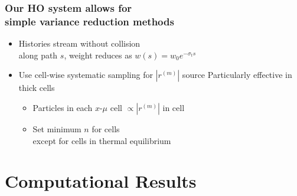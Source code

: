 \documentclass[xcolor=dvipsnames,hyperref={pdfpagelabels=false},unknownkeysallowed,
handout]{beamer}
\newcommand{\colG}[1]{{\color{Gray!110} #1}}
\newlength{\wideitemsep}
\let\olditem\item
\renewcommand{\item}{\setlength{\itemsep}{\wideitemsep}\olditem}
\begin{document}
\begin{frame}
    \frametitle{Our HO system allows for \\ simple variance reduction methods}
    \addtolength{\wideitemsep}{0.15in}
    \begin{itemize}
        \item[] Histories stream without collision \\
            \colG{along path $s$, weight reduces as $w(s)=w_0 e^{-\sigma_t s}$}
        \item[] Use cell-wise {systematic} sampling for $|r^{(m)}|$ source
            \colG{Particularly effective in thick cells}
            \begin{itemize}
                    \vspace{0.02in}
                \item Particles in  each $x$-$\mu$ cell $\propto |r^{(m)}|$ in cell
                \vspace{-0.15in}
                \item Set minimum $n$ for cells  \\
                    \colG{except for cells in thermal equilibrium}
            \end{itemize}
    \end{itemize}
\end{frame}


\section{Computational Results}
\subsection{}
\end{document}
